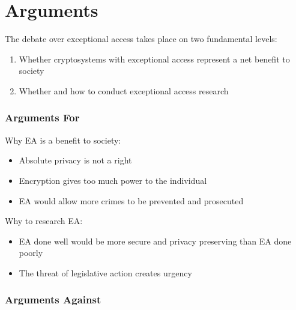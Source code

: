 \chapter{Arguments}
\label{chap-arguments}



The debate over exceptional access takes place on two fundamental levels:
\begin{enumerate}
    \item Whether cryptosystems with exceptional access represent a net benefit to society
    \item Whether and how to conduct exceptional access research
\end{enumerate}

\subsection{Arguments For}

Why EA is a benefit to society:
\begin{itemize}
    \item Absolute privacy is not a right
    \item Encryption gives too much power to the individual
    \item EA would allow more crimes to be prevented and prosecuted
\end{itemize}

Why to research EA:
\begin{itemize}
    \item EA done well would be more secure and privacy preserving than EA done poorly
    \item The threat of legislative action creates urgency
\end{itemize}

\subsection{Arguments Against}

